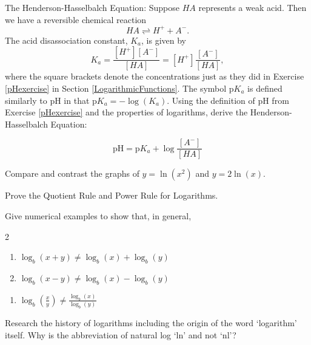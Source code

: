 \documentclass{ximera}
\begin{document}
\begin{problem}\label{HendersonHasselbalch}
    
  The Henderson-Hasselbalch Equation:  Suppose $HA$ represents a weak acid. Then we have a reversible chemical reaction 
\[HA \rightleftharpoons H^{+} + A^{-}.\]  
The acid disassociation constant, $K_{a}$, is given by 
\[K_{a} = \frac{[H^{+}][A^{-}]}{[HA]} = [H^{+}]\frac{[A^{-}]}{[HA]},\]
where the square brackets denote the concentrations just as they did in Exercise \ref{pHexercise} in Section \ref{LogarithmicFunctions}.  The symbol p$K_{a}$ is defined similarly to pH in that p$K_{a} = -\log(K_{a})$.  Using the definition of pH from Exercise \ref{pHexercise} and the properties of logarithms, derive the Henderson-Hasselbalch Equation:

\[\mbox{pH} = \mbox{p}K_{a} + \log\frac{[A^{-}]}{[HA]}\]
\end{problem}

\begin{problem}
    Compare and contrast the graphs of $y = \ln(x^{2})$ and $y = 2\ln(x)$.
\end{problem}

\begin{problem}
    Prove the Quotient Rule and Power Rule for Logarithms.
\end{problem}

\begin{problem}
    Give numerical examples to show that, in general,

\begin{multicols}{2}
\begin{enumerate}

\item $\log_{b}(x + y) \neq \log_{b}(x) + \log_{b}(y)$
\item $\log_{b}(x - y) \neq \log_{b}(x) - \log_{b}(y)$
\setcounter{HWindent}{\value{enumii}}
\end{enumerate}
\end{multicols}

\begin{enumerate}
\setcounter{enumii}{\value{HWindent}}

\item $\log_{b}\left(\frac{x}{y}\right) \neq \frac{\log_{b}(x)}{\log_{b}(y)}$

\end{enumerate}
\end{problem}

\begin{problem}
    Research the history of logarithms including the origin of the word `logarithm' itself.  Why is the abbreviation of natural log `ln' and not `nl'?
\end{problem}
\end{document}
